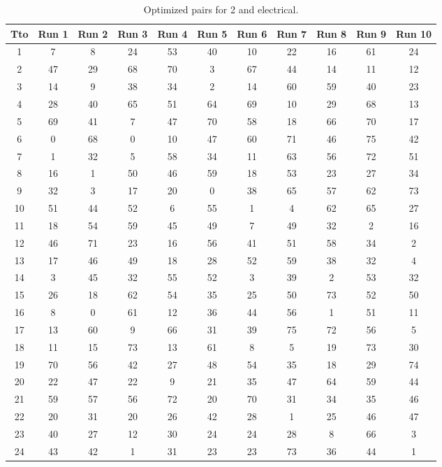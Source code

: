 \begin{table}
  \centering
  \scriptsize
  \caption{Optimized pairs for 2 and electrical.}
  \label{tab_pairs}
\begin{tabular}{c c c c c c c c c c c }
\hline
Tto & Run 1 & Run 2 & Run 3 & Run 4 & Run 5 & Run 6 & Run 7 & Run 8 & Run 9 & Run 10 \\
\hline
1 & 7 & 8 & 24 & 53 & 40 & 10 & 22 & 16 & 61 & 24 \\
2 & 47 & 29 & 68 & 70 & 3 & 67 & 44 & 14 & 11 & 12 \\
3 & 14 & 9 & 38 & 34 & 2 & 14 & 60 & 59 & 40 & 23 \\
4 & 28 & 40 & 65 & 51 & 64 & 69 & 10 & 29 & 68 & 13 \\
5 & 69 & 41 & 7 & 47 & 70 & 58 & 18 & 66 & 70 & 17 \\
6 & 0 & 68 & 0 & 10 & 47 & 60 & 71 & 46 & 75 & 42 \\
7 & 1 & 32 & 5 & 58 & 34 & 11 & 63 & 56 & 72 & 51 \\
8 & 16 & 1 & 50 & 46 & 59 & 18 & 53 & 23 & 27 & 34 \\
9 & 32 & 3 & 17 & 20 & 0 & 38 & 65 & 57 & 62 & 73 \\
10 & 51 & 44 & 52 & 6 & 55 & 1 & 4 & 62 & 65 & 27 \\
11 & 18 & 54 & 59 & 45 & 49 & 7 & 49 & 32 & 2 & 16 \\
12 & 46 & 71 & 23 & 16 & 56 & 41 & 51 & 58 & 34 & 2 \\
13 & 17 & 46 & 49 & 18 & 28 & 52 & 59 & 38 & 32 & 4 \\
14 & 3 & 45 & 32 & 55 & 52 & 3 & 39 & 2 & 53 & 32 \\
15 & 26 & 18 & 62 & 54 & 35 & 25 & 50 & 73 & 52 & 50 \\
16 & 8 & 0 & 61 & 12 & 36 & 44 & 56 & 1 & 51 & 11 \\
17 & 13 & 60 & 9 & 66 & 31 & 39 & 75 & 72 & 56 & 5 \\
18 & 11 & 15 & 73 & 13 & 61 & 8 & 5 & 19 & 73 & 30 \\
19 & 70 & 56 & 42 & 27 & 48 & 54 & 35 & 18 & 29 & 74 \\
20 & 22 & 47 & 22 & 9 & 21 & 35 & 47 & 64 & 59 & 44 \\
21 & 59 & 57 & 56 & 72 & 20 & 70 & 31 & 34 & 35 & 46 \\
22 & 20 & 31 & 20 & 26 & 42 & 28 & 1 & 25 & 46 & 47 \\
23 & 40 & 27 & 12 & 30 & 24 & 24 & 28 & 8 & 66 & 3 \\
24 & 43 & 42 & 1 & 31 & 23 & 23 & 73 & 36 & 44 & 1 \\

\end{tabular}
\end{table}
